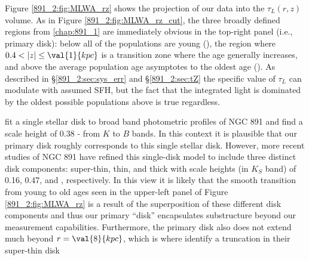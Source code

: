 Figure \ref{891_2:fig:MLWA_rz} shows the projection of our data into
the $\tau_L(r,z)$ volume. As in Figure \ref{891_2:fig:MLWA_rz_cut}, the
three broadly defined regions from \ref{chap:891_1} are immediately
obvious in the top-right panel (i.e., primary disk): below
 all of the populations are young (), the
region where $0.4 < |z| \leq \val{1}{kpc}$ is a transition zone where
the age generally increases, and above  the average
population age asymptotes to the oldest age (). As
described in \S\ref{891_2:sec:sys_err} and \S\ref{891_2:sec:tZ} the
specific value of $\tau_L$ can modulate with assumed SFH, but the fact
that the integrated light is dominated by the oldest possible
populations above  is true regardless.

\citet{Xilouris99} fit a single stellar disk to broad band photometric
profiles of NGC 891 and find a scale height of 0.38 - 
from $K$ to $B$ bands. In this context it is plausible that our
primary disk roughly corresponds to this single stellar disk. However,
more recent studies of NGC 891 \citep{Schechtman-Rook12,
  Schechtman-Rook13, Schechtman-Rook14} have refined this single-disk
model to include three distinct disk components: super-thin, thin, and
thick with scale heights (in $K_S$ band) of 0.16, 0.47, and
, respectively. In this view it is likely that the
smooth transition from young to old ages seen in the upper-left panel
of Figure \ref{891_2:fig:MLWA_rz} is a result of the superposition of
these different disk components and thus our primary ``disk''
encapsulates substructure beyond our measurement
capabilities. Furthermore, the primary disk also does not extend much
beyond $r=\val{8}{kpc}$, which is where \citet{Schechtman-Rook13}
identify a truncation in their super-thin disk



